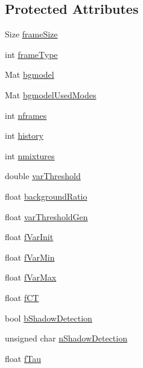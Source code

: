\subsection*{Protected Attributes}
\begin{DoxyCompactItemize}
\item 
Size \hyperlink{classcv_1_1BackgroundSubtractorMOG2_a83315ebddce879ed98e82b498cd3fe39}{frame\-Size}
\item 
int \hyperlink{classcv_1_1BackgroundSubtractorMOG2_a4b7d5f7c5f83596b04e91ff491130fcc}{frame\-Type}
\item 
Mat \hyperlink{classcv_1_1BackgroundSubtractorMOG2_ab1fd7b8bfe82a8ca85a89f5eb89d30f2}{bgmodel}
\item 
Mat \hyperlink{classcv_1_1BackgroundSubtractorMOG2_a61da8c79d3d8e00a79f98488faa9fdeb}{bgmodel\-Used\-Modes}
\item 
int \hyperlink{classcv_1_1BackgroundSubtractorMOG2_ab11b49adc9af83ba0f0256e6ff32f3e3}{nframes}
\item 
int \hyperlink{classcv_1_1BackgroundSubtractorMOG2_a4f9ee3abc7718c771437c954ce787670}{history}
\item 
int \hyperlink{classcv_1_1BackgroundSubtractorMOG2_ac30e10d48c1123f96f4c5efe48943cbe}{nmixtures}
\item 
double \hyperlink{classcv_1_1BackgroundSubtractorMOG2_a29b2fd0136714c18f5dac426f23891e3}{var\-Threshold}
\item 
float \hyperlink{classcv_1_1BackgroundSubtractorMOG2_a6a90564206833ec72568f59978efe1d6}{background\-Ratio}
\item 
float \hyperlink{classcv_1_1BackgroundSubtractorMOG2_a7989b0787eb340a8e9bac7f5dd42f6a7}{var\-Threshold\-Gen}
\item 
float \hyperlink{classcv_1_1BackgroundSubtractorMOG2_a89adf62b1e29f0caeddb6716c4ee746d}{f\-Var\-Init}
\item 
float \hyperlink{classcv_1_1BackgroundSubtractorMOG2_a85ed3739d6b278dafec0ea7eb6c6eebf}{f\-Var\-Min}
\item 
float \hyperlink{classcv_1_1BackgroundSubtractorMOG2_a979e313829b634396d951090bb6a11ac}{f\-Var\-Max}
\item 
float \hyperlink{classcv_1_1BackgroundSubtractorMOG2_ac9879982900ad4e9998f5a1f6e5f837f}{f\-C\-T}
\item 
bool \hyperlink{classcv_1_1BackgroundSubtractorMOG2_ad3f5f023594da1e0e90e85c7c04a5bf2}{b\-Shadow\-Detection}
\item 
unsigned char \hyperlink{classcv_1_1BackgroundSubtractorMOG2_a7cf3027fdb993e02b2b7a0bdfc012c6d}{n\-Shadow\-Detection}
\item 
float \hyperlink{classcv_1_1BackgroundSubtractorMOG2_a13f9679efdd758a6b5ed886f0a2d43bb}{f\-Tau}
\end{DoxyCompactItemize}
